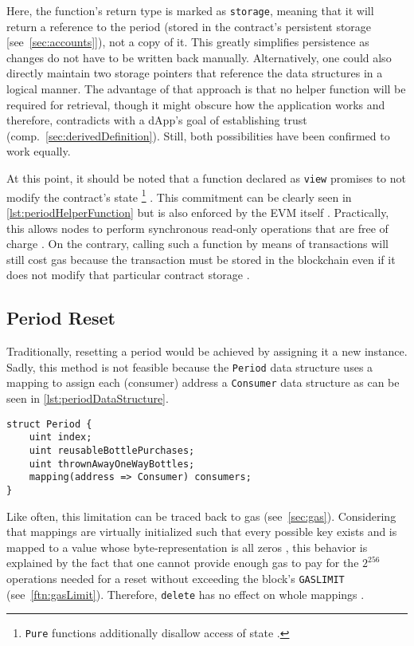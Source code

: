 Here, the function's return type is marked as \texttt{storage}, meaning that it will return a reference to the period (stored in the contract's persistent storage [see~\ref{sec:accounts}]), not a copy of it. This greatly simplifies persistence as changes do not have to be written back manually. Alternatively, one could also directly maintain two storage pointers that reference the data structures in a logical manner. The advantage of that approach is that no helper function will be required for retrieval, though it might obscure how the application works and therefore, contradicts with a \ac{dApp}'s goal of establishing trust (comp.~\ref{sec:derivedDefinition}). Still, both possibilities have been confirmed to work equally.
 
 At this point, it should be noted that a function declared as \texttt{view} promises to not modify the contract's state \footnote{\texttt{Pure} functions additionally disallow access of state \cite[p.~82]{solidityDocs}.} \cite[p.~82]{solidityDocs}. This commitment can be clearly seen in \autoref{lst:periodHelperFunction} but is also enforced by the \ac{EVM} itself \cite[p.~83]{solidityDocs}. Practically, this allows nodes to perform synchronous read-only operations that are free of charge \cite{transactionCall}. On the contrary, calling such a function by means of transactions will still cost gas because the transaction must be stored in the blockchain even if it does not modify that particular contract storage \cite{constantGas}. 
 
\subsection{Period Reset}
Traditionally, resetting a period would be achieved by assigning it a new instance. Sadly, this method is not feasible because the \texttt{Period} data structure uses a mapping to assign each (consumer) address a \texttt{Consumer} data structure as can be seen in \autoref{lst:periodDataStructure}. 

\begin{lstlisting}[language=Solidity, caption=Period data structure, label=lst:periodDataStructure]
struct Period {
	uint index;
	uint reusableBottlePurchases;
	uint thrownAwayOneWayBottles;
	mapping(address => Consumer) consumers;
}
\end{lstlisting}

Like often, this limitation can be traced back to gas (see~\ref{sec:gas}). Considering that mappings are virtually initialized such that every possible key exists and is mapped to a value whose byte-representation is all zeros \cite[p.~62]{solidityDocs}, this behavior is explained by the fact that one cannot provide enough gas to pay for the $2^{256}$ operations needed for a reset without exceeding the block's \texttt{GASLIMIT} (see~\autoref{ftn:gasLimit}). Therefore, \texttt{delete} has no effect on whole mappings \cite[p.~63]{solidityDocs}.

